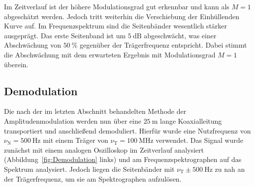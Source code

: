 \documentclass[a4paper,twoside,final]{article}
\begin{document}
Im Zeitverlauf ist der höhere Modulationsgrad gut erkennbar und kann als $M = 1$ abgeschätzt werden. Jedoch tritt weiterhin die Verschiebung der Einhüllenden Kurve auf. Im Frequenzspektrum sind die Seitenbänder wesentlich stärker ausgeprägt. Das erste Seitenband ist um $\SI{5}{\deci\bel}$ abgeschwächt, was einer Abschwächung von $\SI{50}{\percent}$ gegenüber der Trägerfrequenz entspricht. Dabei stimmt die Abschwächung mit dem erwarteten Ergebnis mit Modulationsgrad $M =1$ überein.
\subsection{Demodulation}
Die nach der im letzten Abschnitt behandelten Methode der Amplitudenmodulation werden nun über eine $\SI{25}{\metre}$ lange Koaxialleitung transportiert und anschließend demoduliert. Hierfür wurde eine Nutzfrequenz von $\nu_\text{N} =\SI{500}{\hertz}$ mit einem Träger von $\nu_\text{T}=\SI{100}{\mega\hertz}$ verwendet. Das Signal wurde zunächst mit einem analogen Oszilloskop im Zeitverlauf analysiert (Abbildung~\ref{fig:Demodulation} links) und am Frequenzspektrographen auf das Spektrum analysiert. Jedoch liegen die Seitenbänder mit $\nu_\text{T}\pm\SI{500}{\hertz}$ zu nah an der Trägerfrequenz, um sie am Spektrographen aufzulösen.
\end{document}
